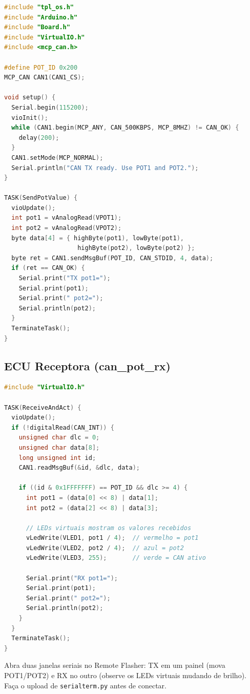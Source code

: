 \documentclass[12pt,a4paper]{article}
\begin{document}
\begin{lstlisting}[language=C++,caption={can\_pot\_tx.cpp}]
#include "tpl_os.h"
#include "Arduino.h"
#include "Board.h"
#include "VirtualIO.h"
#include <mcp_can.h>

#define POT_ID 0x200
MCP_CAN CAN1(CAN1_CS);

void setup() {
  Serial.begin(115200);
  vioInit();
  while (CAN1.begin(MCP_ANY, CAN_500KBPS, MCP_8MHZ) != CAN_OK) {
    delay(200);
  }
  CAN1.setMode(MCP_NORMAL);
  Serial.println("CAN TX ready. Use POT1 and POT2.");
}

TASK(SendPotValue) {
  vioUpdate();
  int pot1 = vAnalogRead(VPOT1);
  int pot2 = vAnalogRead(VPOT2);
  byte data[4] = { highByte(pot1), lowByte(pot1),
                    highByte(pot2), lowByte(pot2) };
  byte ret = CAN1.sendMsgBuf(POT_ID, CAN_STDID, 4, data);
  if (ret == CAN_OK) {
    Serial.print("TX pot1=");
    Serial.print(pot1);
    Serial.print(" pot2=");
    Serial.println(pot2);
  }
  TerminateTask();
}
\end{lstlisting}

\subsection{ECU Receptora (can\_pot\_rx)}

\begin{lstlisting}[language=C++,caption={can\_pot\_rx.cpp (trecho relevante)}]
#include "VirtualIO.h"

TASK(ReceiveAndAct) {
  vioUpdate();
  if (!digitalRead(CAN_INT)) {
    unsigned char dlc = 0;
    unsigned char data[8];
    long unsigned int id;
    CAN1.readMsgBuf(&id, &dlc, data);

    if ((id & 0x1FFFFFFF) == POT_ID && dlc >= 4) {
      int pot1 = (data[0] << 8) | data[1];
      int pot2 = (data[2] << 8) | data[3];

      // LEDs virtuais mostram os valores recebidos
      vLedWrite(VLED1, pot1 / 4);  // vermelho = pot1
      vLedWrite(VLED2, pot2 / 4);  // azul = pot2
      vLedWrite(VLED3, 255);       // verde = CAN ativo

      Serial.print("RX pot1=");
      Serial.print(pot1);
      Serial.print(" pot2=");
      Serial.println(pot2);
    }
  }
  TerminateTask();
}
\end{lstlisting}

\begin{dicabox}
Abra duas janelas seriais no Remote Flasher: TX em um painel (mova POT1/POT2) e RX no outro (observe os LEDs virtuais mudando de brilho). Faça o upload de \texttt{serialterm.py} antes de conectar.
\end{dicabox}
\end{document}
